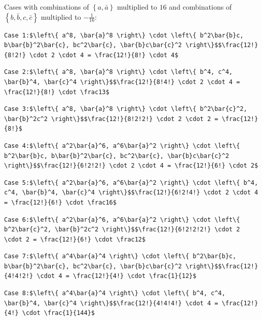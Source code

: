 \begin{enumerate}
 Cases with combinations of $\left\{ a, \bar{a} \right\}$ multiplied to $16$ and combinations of $\left\{ b, \bar{b}, c, \bar{c} \right\}$ multiplied to $-\frac{1}{16}$:

 \begin{verbatim}
Case 1:$\left\{ a^8, \bar{a}^8 \right\} \cdot \left\{ b^2\bar{b}c, b\bar{b}^2\bar{c}, bc^2\bar{c}, \bar{b}c\bar{c}^2 \right\}$$\frac{12!}{8!2!} \cdot 2 \cdot 4 = \frac{12!}{8!} \cdot 4$
\end{verbatim}

\begin{verbatim}
Case 2:$\left\{ a^8, \bar{a}^8 \right\} \cdot \left\{ b^4, c^4, \bar{b}^4, \bar{c}^4 \right\}$$\frac{12!}{8!4!} \cdot 2 \cdot 4 = \frac{12!}{8!} \cdot \frac13$ 
\end{verbatim}

\begin{verbatim}
Case 3:$\left\{ a^8, \bar{a}^8 \right\} \cdot \left\{ b^2\bar{c}^2, \bar{b}^2c^2 \right\}$$\frac{12!}{8!2!2!} \cdot 2 \cdot 2 = \frac{12!}{8!}$ 
\end{verbatim}

\begin{verbatim}
Case 4:$\left\{ a^2\bar{a}^6, a^6\bar{a}^2 \right\} \cdot \left\{ b^2\bar{b}c, b\bar{b}^2\bar{c}, bc^2\bar{c}, \bar{b}c\bar{c}^2 \right\}$$\frac{12!}{6!2!2!} \cdot 2 \cdot 4 = \frac{12!}{6!} \cdot 2$
\end{verbatim}

\begin{verbatim}
Case 5:$\left\{ a^2\bar{a}^6, a^6\bar{a}^2 \right\} \cdot \left\{ b^4, c^4, \bar{b}^4, \bar{c}^4 \right\}$$\frac{12!}{6!2!4!} \cdot 2 \cdot 4 = \frac{12!}{6!} \cdot \frac16$ 
\end{verbatim}

\begin{verbatim}
Case 6:$\left\{ a^2\bar{a}^6, a^6\bar{a}^2 \right\} \cdot \left\{ b^2\bar{c}^2, \bar{b}^2c^2 \right\}$$\frac{12!}{6!2!2!2!} \cdot 2 \cdot 2 = \frac{12!}{6!} \cdot \frac12$ 
\end{verbatim}

\begin{verbatim}
Case 7:$\left\{ a^4\bar{a}^4 \right\} \cdot \left\{ b^2\bar{b}c, b\bar{b}^2\bar{c}, bc^2\bar{c}, \bar{b}c\bar{c}^2 \right\}$$\frac{12!}{4!4!2!} \cdot 4 = \frac{12!}{4!} \cdot \frac{1}{12}$
\end{verbatim}

\begin{verbatim}
Case 8:$\left\{ a^4\bar{a}^4 \right\} \cdot \left\{ b^4, c^4, \bar{b}^4, \bar{c}^4 \right\}$$\frac{12!}{4!4!4!} \cdot 4 = \frac{12!}{4!} \cdot \frac{1}{144}$ 
\end{verbatim}


\end{enumerate}
